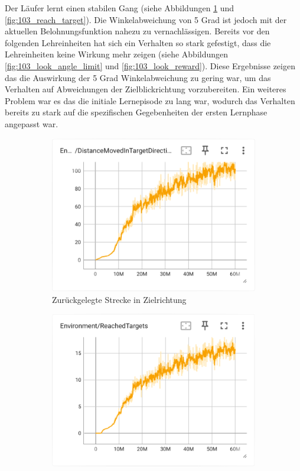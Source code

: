 Der Läufer lernt einen stabilen Gang (siehe Abbildungen \ref{fig:103_move_target_dir} und \ref{fig:103_reach_target}). Die Winkelabweichung von 5 Grad ist jedoch mit der aktuellen Belohnungsfunktion nahezu zu vernachlässigen. Bereits vor den folgenden Lehreinheiten hat sich ein Verhalten so stark gefestigt, dass die Lehreinheiten keine Wirkung mehr zeigen (siehe Abbildungen \ref{fig:103_look_angle_limit} und \ref{fig:103_look_reward}). Diese Ergebnisse zeigen das die Auswirkung der 5 Grad Winkelabweichung zu gering war, um das Verhalten auf Abweichungen der Zielblickrichtung vorzubereiten. Ein weiteres Problem war es das die initiale Lernepisode zu lang war, wodurch das Verhalten bereits zu stark auf die spezifischen Gegebenheiten der ersten Lernphase angepasst war.

\begin{figure}[H]
  \centering  
    \begin{subfigure}{.49\textwidth}
      \centering  
      \includegraphics[width=\textwidth]{img/103_move_target_dir}
      \caption{Zurückgelegte Strecke in Zielrichtung}
      \label{fig:103_move_target_dir}
    \end{subfigure}
    \begin{subfigure}{.49\textwidth}
      \centering  
      \includegraphics[width=\textwidth]{img/103_reach_target}

\end{subfigure}
\end{figure}
